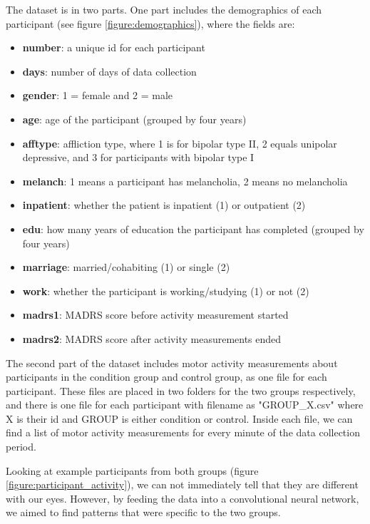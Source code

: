 The dataset is in two parts. One part includes the demographics of each participant (see figure \ref{figure:demographics}), where the fields are:

\begin{itemize}
    \item \textbf{number}: a unique id for each participant
    \item \textbf{days}: number of days of data collection 
    \item \textbf{gender}: 1 = female and 2 = male
    \item \textbf{age}: age of the participant (grouped by four years)
    \item \textbf{afftype}: affliction type, where 1 is for bipolar type II, 2 equals unipolar depressive, and 3 for participants with bipolar type I
    \item \textbf{melanch}: 1 means a participant has melancholia, 2 means no melancholia
    \item \textbf{inpatient}: whether the patient is inpatient (1) or outpatient (2)
    \item \textbf{edu}: how many years of education the participant has completed (grouped by four years)
    \item \textbf{marriage}: married/cohabiting (1) or single (2)
    \item \textbf{work}: whether the participant is working/studying (1) or not (2)
    \item \textbf{madrs1}: MADRS score before activity measurement started
    \item \textbf{madrs2}: MADRS score after activity measurements ended
\end{itemize}

The second part of the dataset includes motor activity measurements about participants in the condition group and control group, as one file for each participant. These files are placed in two folders for the two groups respectively, and there is one file for each participant with filename as "GROUP\_X.csv" where X is their id and GROUP is either condition or control. Inside each file, we can find a list of motor activity measurements for every minute of the data collection period.

Looking at example participants from both groups (figure \ref{figure:participant_activity}), we can not immediately tell that they are different with our eyes. However, by feeding the data into a convolutional neural network, we aimed to find patterns that were specific to the two groups. 

